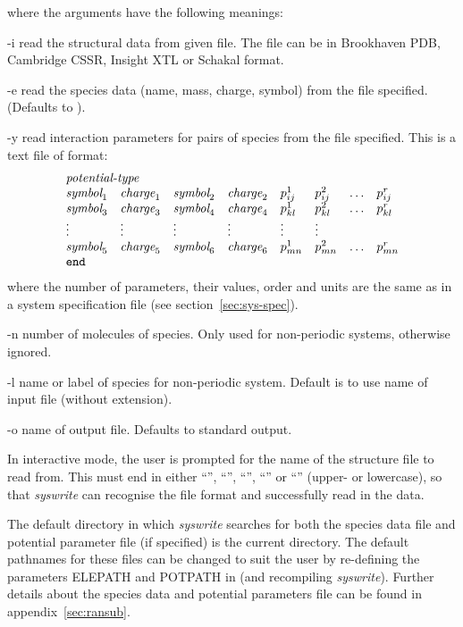 \documentclass[a4paper,twoside]{report}
\begin{document}
where the arguments have the following meanings:
\begin{Argdescription}
\item[-i] read the structural data from given file. The file can be in
 Brookhaven PDB, Cambridge CSSR, Insight XTL or Schakal format.
\item[-e] read the species data (name, mass, charge, symbol) from the file
specified. (Defaults to ).
\item[-y] read interaction parameters for pairs of species
from the file specified. This is a text file of format:
\begin{displaymath}
\begin{array}{llllllll}
\multicolumn{4}{l}{\textit{potential-type}} \\
\textit{symbol}_1 & \textit{charge}_1 & \textit{symbol}_2 & \textit{charge}_2
 & p^{1}_{ij} & p^{2}_{ij} & \ldots & p^{r}_{ij}  \\
\textit{symbol}_3 & \textit{charge}_3 & \textit{symbol}_4 & \textit{charge}_4
 & p^{1}_{kl} & p^{2}_{kl} & \ldots & p^{r}_{kl}  \\
\vdots & \vdots & \vdots & \vdots & \vdots & \vdots \\
\textit{symbol}_5 & \textit{charge}_5 & \textit{symbol}_6 & \textit{charge}_6
 & p^{1}_{mn} & p^{2}_{mn} & \ldots & p^{r}_{mn}  \\
\Lit{end} \\
\end{array}
\end{displaymath}
where the number of parameters, their values, order and units are the same
as in a system specification file (see section~\ref{sec:sys-spec}).
\item[-n] number of molecules of species. Only used for non-periodic systems, otherwise ignored.
\item[-l] name or label of species for non-periodic system. Default is to use name of input file (without extension).
\item[-o] name of output file. Defaults to standard output.
\end{Argdescription}

In interactive mode, the user is prompted for the name of the structure
file to read from. This must end in either ``'', ``'',
``'', ``'' or ``'' (upper- or lowercase), so that \emph{syswrite} can
recognise the file format and successfully read in the data.

The default directory in which \emph{syswrite} searches for both the
species data file and potential parameter file (if specified) is the
current directory. The default pathnames for these
files can be changed to suit the user by re-defining the
parameters ELEPATH and POTPATH in  (and
recompiling \emph{syswrite}). Further details about the species data
and potential parameters file can be found in appendix~\ref{sec:ransub}.
\end{document}
